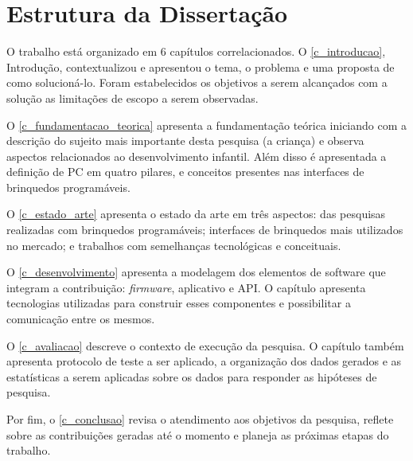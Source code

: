 \section{Estrutura da Dissertação}
\label{s_cintro_estrutura}


O trabalho está organizado em 6 capítulos correlacionados. O \autoref{c_introducao}, Introdução, contextualizou e apresentou o tema, o problema e uma proposta de como solucioná-lo. Foram estabelecidos os objetivos a serem alcançados com a solução as limitações de escopo a serem observadas.

O \autoref{c_fundamentacao_teorica} apresenta a fundamentação teórica iniciando com a descrição do sujeito mais importante desta pesquisa (a criança) e observa aspectos relacionados ao desenvolvimento infantil. Além disso é apresentada a definição de \ac{PC} em quatro pilares, e conceitos presentes nas interfaces de brinquedos programáveis.

O \autoref{c_estado_arte} apresenta o estado da arte em três aspectos: das pesquisas realizadas com brinquedos programáveis; interfaces de brinquedos mais utilizados no mercado; e trabalhos com semelhanças tecnológicas e conceituais.

O \autoref{c_desenvolvimento} apresenta a modelagem dos elementos de software que integram a contribuição: \textit{firmware}, aplicativo e API. O capítulo apresenta tecnologias utilizadas para construir esses componentes e possibilitar a comunicação entre os mesmos.

O \autoref{c_avaliacao} descreve o contexto de execução da pesquisa. O capítulo também apresenta protocolo de teste a ser aplicado, a organização dos dados gerados e as estatísticas a serem aplicadas sobre os dados para responder as hipóteses de pesquisa.

Por fim, o \autoref{c_conclusao} revisa o atendimento aos objetivos da pesquisa, reflete sobre as contribuições geradas até o momento e planeja as próximas etapas do trabalho.

